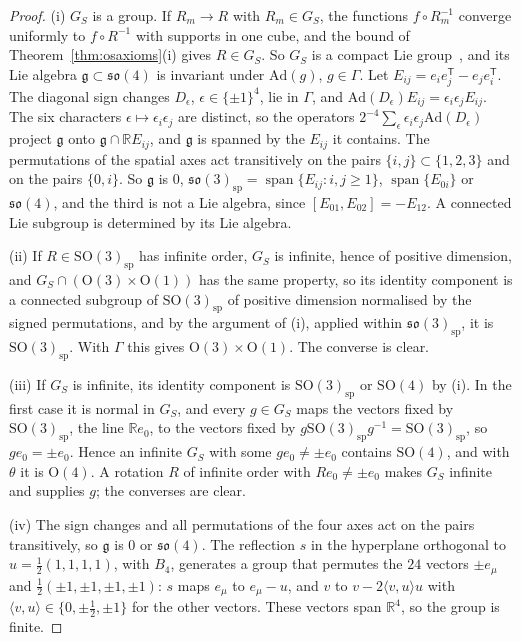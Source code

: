 \documentclass[aps,prd,twocolumn,superscriptaddress,nofootinbib,longbibliography,floatfix,amsmath,amssymb,10pt]{revtex4-2}
\theoremstyle{definition}
\theoremstyle{remark}
\newcommand{\R}{\mathbb{R}}
\newcommand{\SO}{\mathrm{SO}}
\newcommand{\ip}[2]{\langle #1,#2\rangle}
\begin{document}
\begin{proof}
(i) $G_S$ is a group. If $R_m\to R$ with $R_m\in G_S$, the functions
$f\circ R_m^{-1}$ converge uniformly to $f\circ R^{-1}$ with supports in one
cube, and the bound of Theorem~\ref{thm:osaxioms}(i) gives $R\in G_S$. So
$G_S$ is a compact Lie group~\cite{Bum13}, and its Lie algebra
$\mathfrak g\subset\mathfrak{so}(4)$ is invariant under $\mathrm{Ad}(g)$,
$g\in\Gamma$. Let $E_{ij}=e_ie_j^{\mathsf T}-e_je_i^{\mathsf T}$. The
diagonal sign changes $D_\epsilon$, $\epsilon\in\{\pm1\}^4$, lie in
$\Gamma$, and $\mathrm{Ad}(D_\epsilon)E_{ij}=\epsilon_i\epsilon_jE_{ij}$. The
six characters $\epsilon\mapsto\epsilon_i\epsilon_j$ are distinct, so the
operators $2^{-4}\sum_\epsilon\epsilon_i\epsilon_j\mathrm{Ad}(D_\epsilon)$
project $\mathfrak g$ onto $\mathfrak g\cap\R E_{ij}$, and $\mathfrak g$ is
spanned by the $E_{ij}$ it contains. The permutations of the spatial axes
act transitively on the pairs $\{i,j\}\subset\{1,2,3\}$ and on the pairs
$\{0,i\}$. So $\mathfrak g$ is $0$, $\mathfrak{so}(3)_{\mathrm{sp}}=
\operatorname{span}\{E_{ij}:i,j\ge1\}$, $\operatorname{span}\{E_{0i}\}$ or
$\mathfrak{so}(4)$, and the third is not a Lie algebra, since
$[E_{01},E_{02}]=-E_{12}$. A connected Lie subgroup is determined by its
Lie algebra.

(ii) If $R\in\SO(3)_{\mathrm{sp}}$ has infinite order, $G_S$ is infinite,
hence of positive dimension, and $G_S\cap(\mathrm O(3)\times\mathrm O(1))$
has the same property, so its identity component is a connected subgroup
of $\SO(3)_{\mathrm{sp}}$ of positive dimension normalised by the signed
permutations, and by the argument of (i), applied within
$\mathfrak{so}(3)_{\mathrm{sp}}$, it is $\SO(3)_{\mathrm{sp}}$. With
$\Gamma$ this gives $\mathrm O(3)\times\mathrm O(1)$. The converse is clear.

(iii) If $G_S$ is infinite, its identity component is
$\SO(3)_{\mathrm{sp}}$ or $\SO(4)$ by (i). In the first case it is normal
in $G_S$, and every $g\in G_S$ maps the vectors fixed by
$\SO(3)_{\mathrm{sp}}$, the line $\R e_0$, to the vectors fixed by
$g\SO(3)_{\mathrm{sp}}g^{-1}=\SO(3)_{\mathrm{sp}}$, so $ge_0=\pm e_0$. Hence
an infinite $G_S$ with some $ge_0\ne\pm e_0$ contains $\SO(4)$, and with
$\theta$ it is $\mathrm O(4)$. A rotation $R$ of infinite order with
$Re_0\ne\pm e_0$ makes $G_S$ infinite and supplies $g$; the converses are
clear.

(iv) The sign changes and all permutations of the four axes act on the
pairs transitively, so $\mathfrak g$ is $0$ or $\mathfrak{so}(4)$. The
reflection $s$ in the hyperplane orthogonal to $u=\frac12(1,1,1,1)$, with
$B_4$, generates a group that permutes the $24$ vectors $\pm e_\mu$ and
$\frac12(\pm1,\pm1,\pm1,\pm1)$: $s$ maps $e_\mu$ to $e_\mu-u$, and $v$ to
$v-2\ip vuu$ with $\ip vu\in\{0,\pm\frac12,\pm1\}$ for the other vectors.
These vectors span $\R^4$, so the group is finite.
\end{proof}
\end{document}
